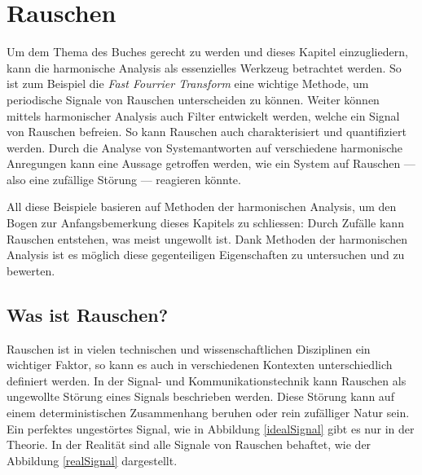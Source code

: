 %
%
%
%

\section{Rauschen\label{brown:Rauschen}}

Um dem Thema des Buches gerecht zu werden und dieses Kapitel einzugliedern, kann die harmonische Analysis als essenzielles Werkzeug betrachtet werden. So ist zum Beispiel die \textit{Fast Fourrier Transform} eine wichtige Methode, um periodische Signale von Rauschen unterscheiden zu können. Weiter können mittels harmonischer Analysis auch Filter entwickelt werden, welche ein Signal von Rauschen befreien. So kann Rauschen auch charakterisiert und quantifiziert werden. Durch die Analyse von Systemantworten auf verschiedene harmonische Anregungen kann eine Aussage getroffen werden, wie ein System auf Rauschen --- also eine zufällige Störung --- reagieren könnte.


All diese Beispiele basieren auf Methoden der harmonischen Analysis, um den Bogen zur Anfangsbemerkung dieses Kapitels zu schliessen: Durch Zufälle kann Rauschen entstehen, was meist ungewollt ist. Dank Methoden der harmonischen Analysis ist es möglich diese gegenteiligen Eigenschaften zu untersuchen und zu bewerten.


\subsection{Was ist Rauschen?\label{brown:Rauschen:Arten}}
Rauschen ist in vielen technischen und wissenschaftlichen Disziplinen ein wichtiger Faktor, so kann es auch in verschiedenen Kontexten unterschiedlich definiert werden. In der Signal- und Kommunikationstechnik kann Rauschen als ungewollte Störung eines Signals beschrieben werden. Diese Störung kann auf einem deterministischen Zusammenhang beruhen oder rein zufälliger Natur sein. Ein perfektes ungestörtes Signal, wie in Abbildung \ref{idealSignal} gibt es nur in der Theorie. In der Realität sind alle Signale von Rauschen behaftet, wie der Abbildung \ref{realSignal} dargestellt.

